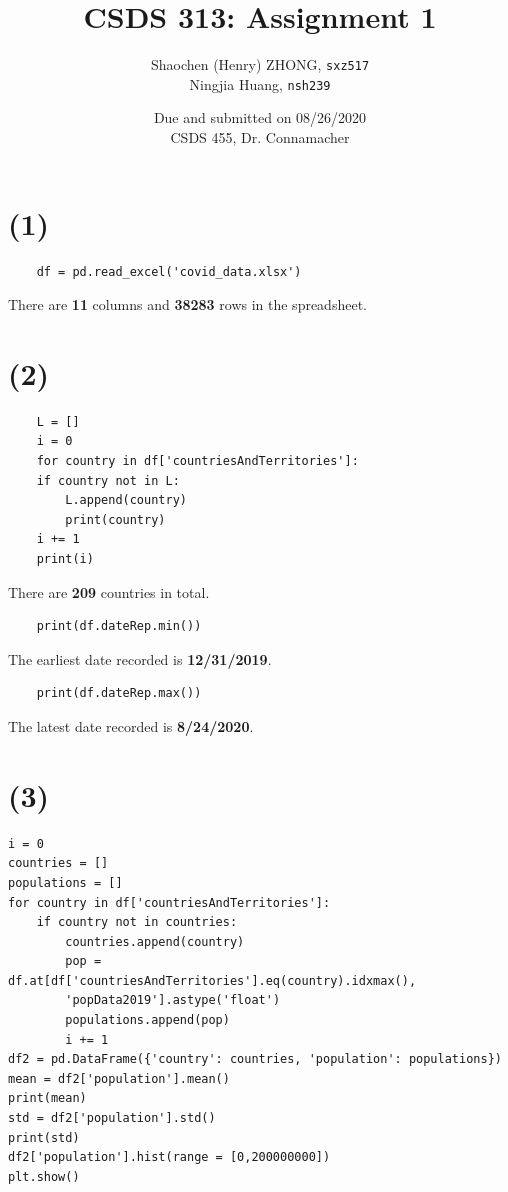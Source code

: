 \documentclass[12pt]{article}
\newcommand{\ilc}{\texttt}
\begin{document}
\title{\textbf{CSDS 313: Assignment 1}}

\author{Shaochen (Henry) ZHONG, \ilc{sxz517} \\Ningjia Huang, \ilc{nsh239}}
\date{Due and submitted on 08/26/2020 \\ CSDS 455, Dr. Connamacher}
\maketitle




\section*{(1)}
\begin{lstlisting}
    df = pd.read_excel('covid_data.xlsx')
\end{lstlisting}

There are \textbf{11} columns and \textbf{38283} rows in the spreadsheet.

\section*{(2)}
\begin{lstlisting}
    L = []
    i = 0
    for country in df['countriesAndTerritories']:
    if country not in L:
        L.append(country)
        print(country)
    i += 1
    print(i)
\end{lstlisting}

There are \textbf{209} countries in total.

\begin{lstlisting}
    print(df.dateRep.min())
\end{lstlisting}

The earliest date recorded is \textbf{12/31/2019}.

\begin{lstlisting}
    print(df.dateRep.max())
\end{lstlisting}

The latest date recorded is \textbf{8/24/2020}.

\section*{(3)}
\begin{lstlisting}
i = 0
countries = []
populations = []
for country in df['countriesAndTerritories']:
    if country not in countries:
        countries.append(country)
        pop = df.at[df['countriesAndTerritories'].eq(country).idxmax(),
        'popData2019'].astype('float')
        populations.append(pop)
        i += 1
df2 = pd.DataFrame({'country': countries, 'population': populations})
mean = df2['population'].mean()
print(mean)
std = df2['population'].std()
print(std)
df2['population'].hist(range = [0,200000000])
plt.show()
\end{lstlisting}
\end{document}
